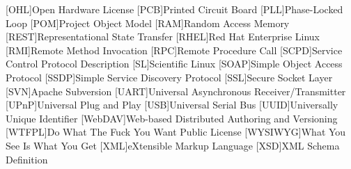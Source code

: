 \begin{acronym}[WYSIWYG]
[OHL]{Open Hardware License}
[PCB]{Printed Circuit Board}
[PLL]{Phase-Locked Loop}
[POM]{Project Object Model}
[RAM]{Random Access Memory}
[REST]{Representational State Transfer}
[RHEL]{Red Hat Enterprise Linux}
[RMI]{Remote Method Invocation}
[RPC]{Remote Procedure Call}
[SCPD]{Service Control Protocol Description}
[SL]{Scientific Linux}
[SOAP]{Simple Object Access Protocol}
[SSDP]{Simple Service Discovery Protocol}
[SSL]{Secure Socket Layer}
[SVN]{Apache Subversion}
[UART]{Universal Asynchronous Receiver/Transmitter}
[UPnP]{Universal Plug and Play}
[USB]{Universal Serial Bus}
[UUID]{Universally Unique Identifier}
[WebDAV]{Web-based Distributed Authoring and Versioning}
[WTFPL]{Do What The Fuck You Want Public License}
[WYSIWYG]{What You See Is What You Get}
[XML]{eXtensible Markup Language}
[XSD]{XML Schema Definition}
\end{acronym}

\acresetall
\clearpage

